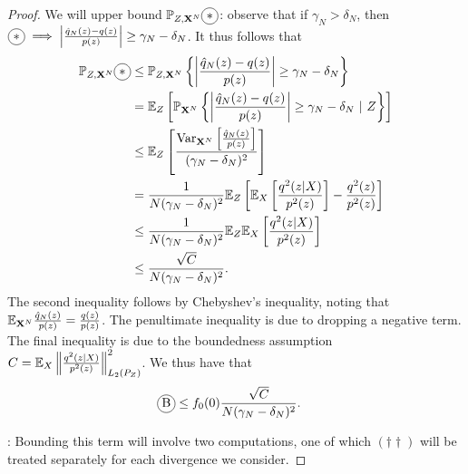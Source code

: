 \begin{proof}
We will upper bound $\mathbb{P}_{Z,\XN} \encircle{$*$}$:
observe that if $\gamma_N > \delta_N$, then  $\encircle{$*$}\implies \left| \frac{\hat{q}_N(z) - q(z)}{p(z)} \right| \geq \gamma_N - \delta_N$.
It thus follows that
\begin{align*}
    \mathbb{P}_{Z,\XN} \encircle{$*$} &\leq  \mathbb{P}_{Z,\XN} \left\lbrace \left| \frac{\hat{q}_N(z) - q(z)}{p(z)} \right| \geq \gamma_N - \delta_N  \right\rbrace\\
    &= \mathbb{E}_Z\left[ \mathbb{P}_{\XN} \left\lbrace \left| \frac{\hat{q}_N(z) - q(z)}{p(z)} \right| \geq \gamma_N - \delta_N  \  | \ Z \right\rbrace \right]\\
    &\leq \mathbb{E}_Z\left[ 
    \frac{\text{Var}_{\XN}\left[ 
    \frac{\hat{q}_N(z)}{p(z)}
    \right]}{(\gamma_N - \delta_N)^2}
    \right]\\
    &= \frac{1}{N(\gamma_N - \delta_N)^2}  \E_Z \left[ \E_{X}\left[
     \frac{q^2(z|X)}{p^2(z)}\right] - \frac{q^2(z)}{p^2(z)} \right]\\
    &\leq \frac{1}{N(\gamma_N - \delta_N)^2}  \E_Z \E_{X}\left[
     \frac{q^2(z|X)}{p^2(z)}\right]\\
    &\leq \frac{\sqrt{C} }{N(\gamma_N - \delta_N)^2}.\\
\end{align*}
The second inequality follows by Chebyshev's inequality, noting that $\mathbb{E}_{\mathbf{X}^N} \frac{\hat{q}_N(z)}{p(z)} = \frac{q(z)}{p(z)}$.
The penultimate inequality is due to dropping a negative term.
The final inequality is due to the boundedness assumption $C =  \mathbb{E}_{X}\left\| \frac{q^2(z|X)}{p^2(z)} \right\|^2_{L_2(P_Z)}$.
We thus have that 
\begin{align*}
    \encircle{B}
    &\leq f_0(0) \frac{\sqrt{C}}{N (\gamma_N - \delta_N)^2}.
\end{align*}


:
Bounding this term will involve two computations, one of which $(\dagger\dagger)$ will be treated separately for each divergence we consider.


\end{proof}
